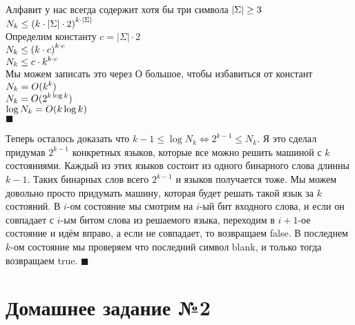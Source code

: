\documentclass{article}
\begin{document}
  \vspace{3mm} \noindent
  Алфавит у нас всегда содержит хотя бы три символа $\displaystyle |\Sigma| \ge 3$ \\
  $\displaystyle N_k \le \left(k \cdot |\Sigma| \cdot 2\right)^{k \cdot |\Sigma|} $ \\
  Определим константу $c = |\Sigma| \cdot 2$ \\
  $\displaystyle N_k \le \left(k \cdot c\right)^{k \cdot c} $ \\
  $\displaystyle N_k \le c \cdot k^{k \cdot c} $ \\
  Мы можем записать это через О большое, чтобы избавиться от констант $\displaystyle N_k = O(k^k) $ \\ %
  $\displaystyle N_k = O(2^{k \log k}) $ \\
  $\displaystyle \log N_k = O(k \log k) $ \\
  $\blacksquare$ %

  \vspace{3mm} \noindent
  Теперь осталось доказать что $k - 1 \le \log N_k \iff 2^{k-1} \le N_k$.
  Я это сделал придумав $2^{k-1}$ конкретных языков, которые все можно решить машиной с $k$ состояниями.
  Каждый из этих языков состоит из одного бинарного слова длинны $k-1$.
  Таких бинарных слов всего $2^{k-1}$ и языков получается тоже.
  Мы можем довольно просто придумать машину, которая будет решать такой язык за $k$ состояний.
  В $i$-ом состояние мы смотрим на $i$-ый бит входного слова, и если он совпадает с $i$-ым битом слова из решаемого языка, переходим в $i+1$-ое состояние и идём вправо, а если не совпадает, то возвращаем false.
  В последнем $k$-ом состояние мы проверяем что последний символ blank, и только тогда возвращаем true.
  $\blacksquare$


  \section{Домашнее задание №2}
  \setcounter{subsection}{6}
\end{document}
